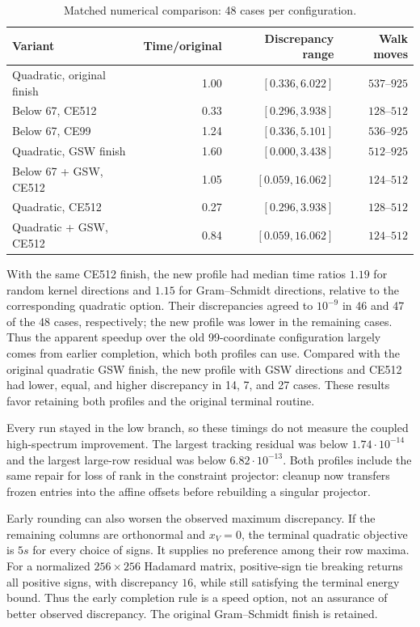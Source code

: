 \documentclass[11pt]{amsart}
\theoremstyle{definition}\newtheorem{definition}[theorem]{Definition}
\theoremstyle{remark}\newtheorem{remark}[theorem]{Remark}
\numberwithin{equation}{section}
\begin{document}
\begin{table}[htbp]
\centering\small
\caption{Matched numerical comparison: 48 cases per configuration.}
\label{tab:matched-profiles}
\begin{tabular}{@{}lrrr@{}}
\toprule
Variant & Time/original & Discrepancy range & Walk moves\\
\midrule
Quadratic, original finish & 1.00 & $[0.336,6.022]$ & $537$--$925$\\
Below 67, CE512 & 0.33 & $[0.296,3.938]$ & $128$--$512$\\
Below 67, CE99 & 1.24 & $[0.336,5.101]$ & $536$--$925$\\
Quadratic, GSW finish & 1.60 & $[0.000,3.438]$ & $512$--$925$\\
Below 67 + GSW, CE512 & 1.05 & $[0.059,16.062]$ & $124$--$512$\\
Quadratic, CE512 & 0.27 & $[0.296,3.938]$ & $128$--$512$\\
Quadratic + GSW, CE512 & 0.84 & $[0.059,16.062]$ & $124$--$512$\\
\bottomrule
\end{tabular}
\end{table}

With the same CE512 finish, the new profile had median time ratios
$1.19$ for random kernel directions and $1.15$ for Gram--Schmidt directions,
relative to the corresponding quadratic option. Their discrepancies agreed
to $10^{-9}$ in 46 and 47 of the 48 cases, respectively; the new profile
was lower in the remaining cases. Thus the apparent speedup over the old
99-coordinate configuration largely comes from earlier completion, which
both profiles can use. Compared with the original quadratic GSW finish,
the new profile with GSW directions and CE512 had lower, equal, and higher
discrepancy in 14, 7, and 27 cases. These results favor retaining both
profiles and the original terminal routine.

Every run stayed in the low branch, so these timings do not measure the
coupled high-spectrum improvement. The largest tracking residual was below
$1.74\cdot10^{-14}$ and the largest large-row residual was below
$6.82\cdot10^{-13}$. Both profiles include the same repair for loss of
rank in the constraint projector: cleanup now transfers frozen entries
into the affine offsets before rebuilding a singular projector.


Early rounding can also worsen the observed maximum discrepancy.
If the remaining columns are orthonormal and $x_V=0$, the terminal
quadratic objective is $5s$ for every choice of signs. It supplies no
preference among their row maxima. For a normalized $256\times256$
Hadamard matrix, positive-sign tie breaking returns all positive signs,
with discrepancy $16$, while still satisfying the terminal energy bound.
Thus the early completion rule is a speed option, not an assurance of
better observed discrepancy. The original Gram--Schmidt finish is retained.
\end{document}
